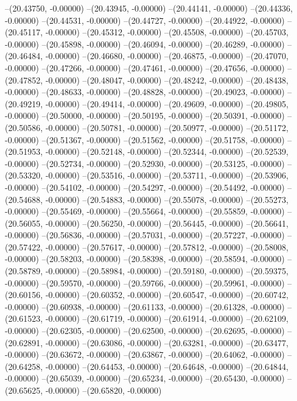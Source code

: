 --(20.43750, -0.00000)
--(20.43945, -0.00000)
--(20.44141, -0.00000)
--(20.44336, -0.00000)
--(20.44531, -0.00000)
--(20.44727, -0.00000)
--(20.44922, -0.00000)
--(20.45117, -0.00000)
--(20.45312, -0.00000)
--(20.45508, -0.00000)
--(20.45703, -0.00000)
--(20.45898, -0.00000)
--(20.46094, -0.00000)
--(20.46289, -0.00000)
--(20.46484, -0.00000)
--(20.46680, -0.00000)
--(20.46875, -0.00000)
--(20.47070, -0.00000)
--(20.47266, -0.00000)
--(20.47461, -0.00000)
--(20.47656, -0.00000)
--(20.47852, -0.00000)
--(20.48047, -0.00000)
--(20.48242, -0.00000)
--(20.48438, -0.00000)
--(20.48633, -0.00000)
--(20.48828, -0.00000)
--(20.49023, -0.00000)
--(20.49219, -0.00000)
--(20.49414, -0.00000)
--(20.49609, -0.00000)
--(20.49805, -0.00000)
--(20.50000, -0.00000)
--(20.50195, -0.00000)
--(20.50391, -0.00000)
--(20.50586, -0.00000)
--(20.50781, -0.00000)
--(20.50977, -0.00000)
--(20.51172, -0.00000)
--(20.51367, -0.00000)
--(20.51562, -0.00000)
--(20.51758, -0.00000)
--(20.51953, -0.00000)
--(20.52148, -0.00000)
--(20.52344, -0.00000)
--(20.52539, -0.00000)
--(20.52734, -0.00000)
--(20.52930, -0.00000)
--(20.53125, -0.00000)
--(20.53320, -0.00000)
--(20.53516, -0.00000)
--(20.53711, -0.00000)
--(20.53906, -0.00000)
--(20.54102, -0.00000)
--(20.54297, -0.00000)
--(20.54492, -0.00000)
--(20.54688, -0.00000)
--(20.54883, -0.00000)
--(20.55078, -0.00000)
--(20.55273, -0.00000)
--(20.55469, -0.00000)
--(20.55664, -0.00000)
--(20.55859, -0.00000)
--(20.56055, -0.00000)
--(20.56250, -0.00000)
--(20.56445, -0.00000)
--(20.56641, -0.00000)
--(20.56836, -0.00000)
--(20.57031, -0.00000)
--(20.57227, -0.00000)
--(20.57422, -0.00000)
--(20.57617, -0.00000)
--(20.57812, -0.00000)
--(20.58008, -0.00000)
--(20.58203, -0.00000)
--(20.58398, -0.00000)
--(20.58594, -0.00000)
--(20.58789, -0.00000)
--(20.58984, -0.00000)
--(20.59180, -0.00000)
--(20.59375, -0.00000)
--(20.59570, -0.00000)
--(20.59766, -0.00000)
--(20.59961, -0.00000)
--(20.60156, -0.00000)
--(20.60352, -0.00000)
--(20.60547, -0.00000)
--(20.60742, -0.00000)
--(20.60938, -0.00000)
--(20.61133, -0.00000)
--(20.61328, -0.00000)
--(20.61523, -0.00000)
--(20.61719, -0.00000)
--(20.61914, -0.00000)
--(20.62109, -0.00000)
--(20.62305, -0.00000)
--(20.62500, -0.00000)
--(20.62695, -0.00000)
--(20.62891, -0.00000)
--(20.63086, -0.00000)
--(20.63281, -0.00000)
--(20.63477, -0.00000)
--(20.63672, -0.00000)
--(20.63867, -0.00000)
--(20.64062, -0.00000)
--(20.64258, -0.00000)
--(20.64453, -0.00000)
--(20.64648, -0.00000)
--(20.64844, -0.00000)
--(20.65039, -0.00000)
--(20.65234, -0.00000)
--(20.65430, -0.00000)
--(20.65625, -0.00000)
--(20.65820, -0.00000)
